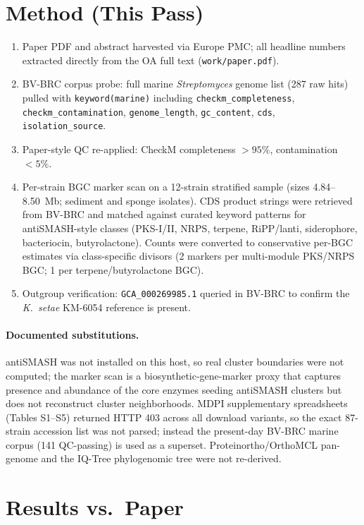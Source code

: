 \documentclass[11pt,letterpaper]{article}
\begin{document}
\section{Method (This Pass)}
\begin{enumerate}
\item Paper PDF and abstract harvested via Europe PMC; all headline numbers extracted directly from the OA full text (\texttt{work/paper.pdf}).
\item BV-BRC corpus probe: full marine \textit{Streptomyces} genome list (287 raw hits) pulled with \texttt{keyword(marine)} including \texttt{checkm\_completeness}, \texttt{checkm\_contamination}, \texttt{genome\_length}, \texttt{gc\_content}, \texttt{cds}, \texttt{isolation\_source}.
\item Paper-style QC re-applied: CheckM completeness $>95\%$, contamination $<5\%$.
\item Per-strain BGC marker scan on a 12-strain stratified sample (sizes 4.84--8.50~Mb; sediment and sponge isolates). CDS product strings were retrieved from BV-BRC and matched against curated keyword patterns for antiSMASH-style classes (PKS-I/II, NRPS, terpene, RiPP/lanti, siderophore, bacteriocin, butyrolactone). Counts were converted to conservative per-BGC estimates via class-specific divisors (2 markers per multi-module PKS/NRPS BGC; 1 per terpene/butyrolactone BGC).
\item Outgroup verification: \texttt{GCA\_000269985.1} queried in BV-BRC to confirm the \textit{K.\ setae} KM-6054 reference is present.
\end{enumerate}

\paragraph{Documented substitutions.}
antiSMASH was not installed on this host, so real cluster boundaries were not computed; the marker scan is a biosynthetic-gene-marker proxy that captures presence and abundance of the core enzymes seeding antiSMASH clusters but does not reconstruct cluster neighborhoods. MDPI supplementary spreadsheets (Tables S1--S5) returned HTTP 403 across all download variants, so the exact 87-strain accession list was not parsed; instead the present-day BV-BRC marine corpus (141 QC-passing) is used as a superset. Proteinortho/OrthoMCL pan-genome and the IQ-Tree phylogenomic tree were not re-derived.

\section{Results vs.\ Paper}
\end{document}
